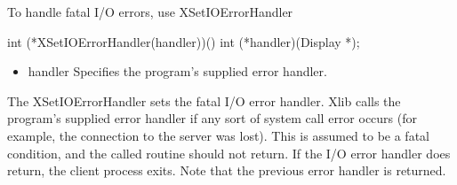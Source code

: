 \documentclass{report}
\begin{document}
\begin{itemize}
            \bigbreak \noindent 
            To handle fatal I/O errors, use XSetIOErrorHandler
            \bigbreak \noindent 
            \begin{cppcode}
                int (*XSetIOErrorHandler(handler))()
                    int (*handler)(Display *);
            \end{cppcode}
            \begin{itemize}
                \item handler Specifies the program’s supplied error handler.
            \end{itemize}
            The XSetIOErrorHandler sets the fatal I/O error handler. Xlib calls the program’s supplied error handler if any sort of system call error occurs (for example, the connection to the server was lost). This is assumed to be a fatal condition, and the called routine should not return. If the I/O error handler does return, the client process exits. Note that the previous error handler is returned.


    \end{itemize}
\end{document}
